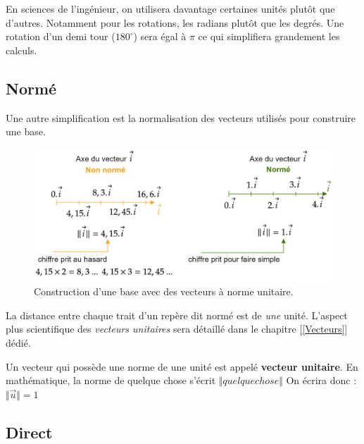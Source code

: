 \documentclass[
	11pt, %
	fleqn, %
	a4paper, %
]{LegrandOrangeBook}
\begin{document}
En sciences de l'ingénieur, on utilisera davantage certaines unités plutôt que d'autres. Notamment pour les rotations, les radians plutôt que les degrés. Une rotation d'un demi tour ($180^{\circ}$) sera égal à $\pi$ ce qui simplifiera grandement les calculs.







\subsection{Normé}

Une autre simplification est la normalisation des vecteurs utilisés pour construire une base. 
\begin{figure}[H] %
	\centering %
	\includegraphics[width=1\textwidth]{Images/norme2.png} %
	\caption{Construction d'une base avec des vecteurs à norme unitaire.}
	\label{norme2} %
\end{figure}

La distance entre chaque trait d'un repère dit normé est de \textit{une} unité. L'aspect plus scientifique des \textit{vecteurs unitaires} sera détaillé dans le chapitre [\ref{Vecteurs}] dédié.

\begin{definition}
Un vecteur qui possède une norme de une unité est appelé \textbf{vecteur unitaire}. En mathématique, la norme de quelque chose s'écrit $ \Vert quelque chose \Vert $ On écrira donc : $ \Vert \Vec{u} \Vert = 1\ $
\end{definition}




\subsection{Direct}
\end{document}
